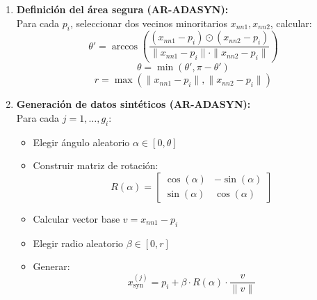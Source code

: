 \documentclass[12pt]{article}
\begin{document}
\begin{enumerate}[label=\textbf{\arabic*.}]
    \item \textbf{Definición del área segura (AR-ADASYN):}\\
    Para cada \( p_i \), seleccionar dos vecinos minoritarios \( x_{nn1}, x_{nn2} \), calcular:
    \[
    \theta' = \arccos \left( \frac{(x_{nn1} - p_i) \odot (x_{nn2} - p_i)}{\|x_{nn1} - p_i\| \cdot \|x_{nn2} - p_i\|} \right)
    \]
    \[
    \theta = \min(\theta', \pi - \theta')
    \]
    \[
    r = \max(\|x_{nn1} - p_i\|, \|x_{nn2} - p_i\|)
    \]

    \item \textbf{Generación de datos sintéticos (AR-ADASYN):}\\
    Para cada \( j = 1, \dots, g_i \):
    \begin{itemize}
        \item Elegir ángulo aleatorio \( \alpha \in [0, \theta] \)
        \item Construir matriz de rotación:
        \[
        R(\alpha) =
        \begin{bmatrix}
        \cos(\alpha) & -\sin(\alpha) \\
        \sin(\alpha) & \cos(\alpha)
        \end{bmatrix}
        \]
        \item Calcular vector base \( v = x_{nn1} - p_i \)
        \item Elegir radio aleatorio \( \beta \in [0, r] \)
        \item Generar:
        \[
        x_{\text{syn}}^{(j)} = p_i + \beta \cdot R(\alpha) \cdot \frac{v}{\|v\|}
        \]
    \end{itemize}
\end{enumerate}
\end{document}
